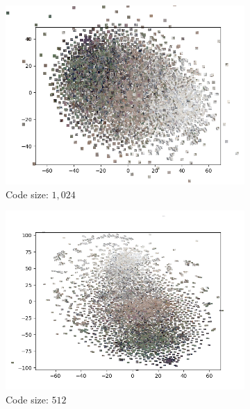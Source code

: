 \begin{figure}[H]
    \centering
    \begin{subfigure}{.5\textwidth}
        \centering
        \includegraphics[width=\textwidth]{images/figures/experiments_latent/pooling_dim1024_images.png}
        \caption{Code size: $1,024$}
    \end{subfigure}%
    \begin{subfigure}{.5\textwidth}
        \centering
        \includegraphics[width=\textwidth]{images/figures/experiments_latent/pooling_dim512_images.png}
        \caption{Code size: $512$}
    \end{subfigure}
    \begin{subfigure}{.5\textwidth}

\end{subfigure}
\end{figure}
